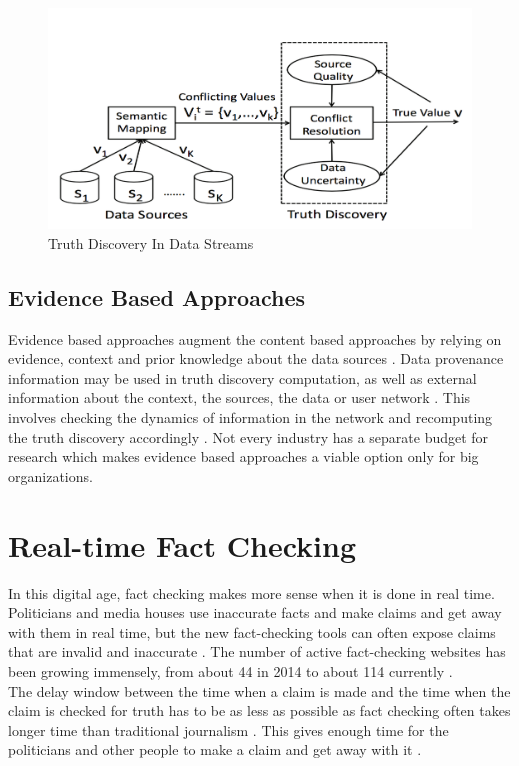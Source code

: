 \documentclass[sigconf]{acmart}
\begin{document}
\begin{figure}
\includegraphics[width=1.0\textwidth]{images/fig1.png}
\caption{Truth Discovery In Data Streams \cite{Zhao2014}}
\end{figure}

\subsection{Evidence Based Approaches}
Evidence based approaches augment the content based approaches by relying on evidence, context and prior knowledge about the data sources \cite{Berti-Equille2016}. Data provenance information may be used in truth discovery computation, as well as external information about the context, the sources, the data or user network \cite{Berti-Equille2016}. This involves checking the dynamics of information in the network and recomputing the truth discovery accordingly \cite{Berti-Equille2016}. Not every industry has a separate budget for research which makes evidence based approaches a viable option only for big organizations.

\section{Real-time Fact Checking}
In this digital age, fact checking makes more sense when it is done in real time. Politicians and media houses use inaccurate facts and make claims and get away with them in real time, but the new fact-checking tools can often expose claims that are invalid and inaccurate \cite{Hassan2015}.  The number of active fact-checking websites has been growing immensely, from about 44 in 2014 to about 114 currently \cite{Hassan2015}. \\
The delay window between the time when a claim is made and the time when the claim is checked for truth has to be as less as possible as fact checking often takes longer time than traditional journalism \cite{Hassan2015}. This gives enough time for the politicians and other people to make a claim and get away with it \cite{Hassan2015}.
\end{document}
